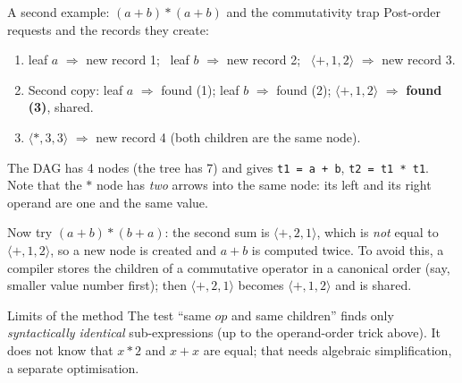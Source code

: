 \documentclass[11pt,a4paper]{article}
\begin{document}
\begin{examplebox}{A second example: $(a+b)*(a+b)$ and the commutativity trap}
Post-order requests and the records they create:
\begin{enumerate}[nosep]
\item leaf $a$ $\Rightarrow$ new record 1; \ leaf $b$ $\Rightarrow$ new record 2; \ $\langle +,1,2\rangle$ $\Rightarrow$ new record 3.
\item Second copy: leaf $a$ $\Rightarrow$ found (1); leaf $b$ $\Rightarrow$ found (2); $\langle +,1,2\rangle$ $\Rightarrow$ \textbf{found (3)}, shared.
\item $\langle *,3,3\rangle$ $\Rightarrow$ new record 4 (both children are the same node).
\end{enumerate}
The DAG has 4 nodes (the tree has 7) and gives \texttt{t1 = a + b}, \texttt{t2 = t1 * t1}. Note that the $*$ node has \emph{two} arrows into the same node: its left and its right operand are one and the same value.

\begin{center}
\end{center} Now try $(a+b)*(b+a)$: the second sum is $\langle +,2,1\rangle$, which is \emph{not} equal to $\langle +,1,2\rangle$, so a new node is created and $a+b$ is computed twice. To avoid this, a compiler stores the children of a commutative operator in a canonical order (say, smaller value number first); then $\langle +,2,1\rangle$ becomes $\langle +,1,2\rangle$ and is shared.
\end{examplebox}

\begin{pitfallbox}{Limits of the method}
The test ``same $\mathit{op}$ and same children'' finds only \emph{syntactically identical} sub-expressions (up to the operand-order trick above). It does not know that $x*2$ and $x+x$ are equal; that needs algebraic simplification, a separate optimisation.
\end{pitfallbox}
\end{document}
